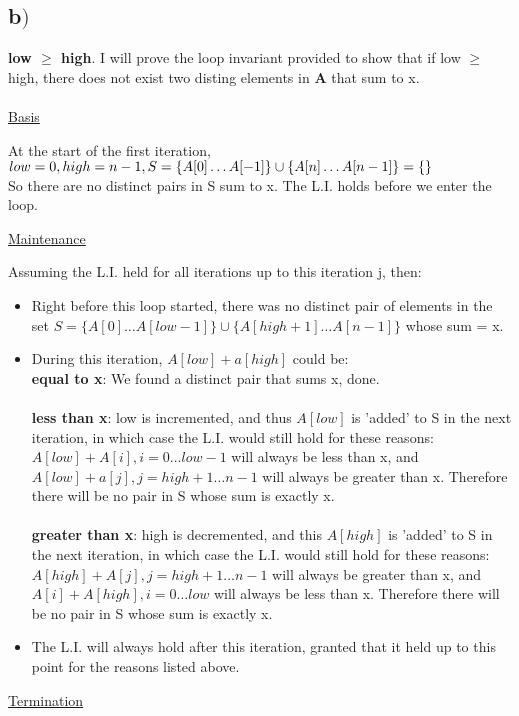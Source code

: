\documentclass[a4paper,12pt]{article}
\begin{document}
\subsection*{b\()\)}
{\bf low \(\ge\) high}. I will prove the loop invariant provided to show that if low \(\ge\) high, 
there does not exist two disting elements in {\bf A} that sum to x.\\\\
\underline{Basis}
\begin{indentpar}{1cm}
  At the start of the first iteration,\\
  \(low = 0, high = n-1,\\ 
  S = \{A[0]\dots A[-1]\} \cup \{A[n] \dots A[n-1]\} = \{\}\)\\
  So there are no distinct pairs in S sum to x. The L.I. holds before we enter the loop.
\end{indentpar}
\underline{Maintenance}
\begin{indentpar}{1cm}
  Assuming the L.I. held for all iterations up to this iteration j, then:
  \begin{itemize}
    \item Right before this loop started, there was no distinct pair of elements in the set 
      \(S = \{A[0] \dots A[low-1]\} \cup \{A[high+1] \dots A[n-1]\}\) whose sum = x.
    \item During this iteration, \(A[low] + a[high]\) could be:\\
      {\bf equal to x}: We found a distinct pair that sums x, done.\\\\
      {\bf less than x}: low is incremented, and thus \(A[low]\) is 'added' to S in the next iteration, in which
      case the L.I. would still hold for these reasons: \(A[low] + A[i], i= 0 \dots low-1\) will always be less than
      x, and \(A[low] + a[j], j = high+1 \dots n-1\) will always be greater than x. Therefore there will be no pair in S
      whose sum is exactly x.\\\\
      {\bf greater than x}: high is decremented, and this \(A[high]\) is 'added' to S in the next iteration, in 
      which case the L.I. would still hold for these reasons: \(A[high] + A[j], j = high+1 \dots n-1\) will always
      be greater than x, and \(A[i] + A[high], i = 0 \dots low\) will always be less than x. Therefore there will be
      no pair in S whose sum is exactly x.
    \item The L.I. will always hold after this iteration, granted that it held up to this point for the reasons listed
      above.
  \end{itemize}
\underline{Termination}
\end{indentpar}
\end{document}
